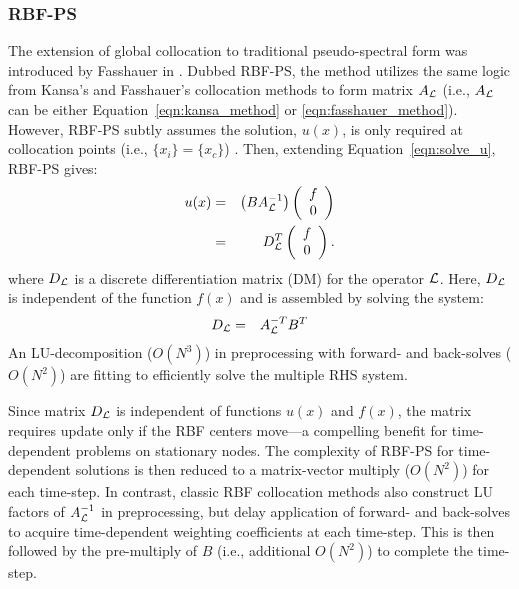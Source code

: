 \documentclass[11pt]{report}
\begin{document}
{%
\subsubsection{RBF-PS}

The extension of global collocation to traditional pseudo-spectral form was introduced by Fasshauer in \cite{Fasshauer2006}. Dubbed RBF-PS, the method utilizes the same logic from Kansa's and Fasshauer's collocation methods to form matrix $A_{\mathcal{L}}$ (i.e., $A_{\mathcal{L}}$ can be either Equation~\ref{eqn:kansa_method} or \ref{eqn:fasshauer_method}). However, RBF-PS subtly assumes the solution, $u(x)$, is only required at collocation points (i.e., $\{x_i\} = \{x_c\}$) \cite{Fasshauer2006, Fasshauer2007}. Then, extending Equation~\ref{eqn:solve_u}, RBF-PS gives:
\begin{eqnarray}
u(x) & = & \left( B A^{-1}_{\mathcal{L}} \right) \left( \begin{array}{cc}  f \\ 0  \end{array} \right) \nonumber \\
& = & D^T_{\mathcal{L}} \left( \begin{array}{cc}  f \\ 0  \end{array} \right) \label{eq:rbf-ps}.
\end{eqnarray}
where $D_{\mathcal{L}}$ is a discrete differentiation matrix (DM) for the operator $\mathcal{L}$.
Here, $D_{\mathcal{L}}$ is independent of the function $f(x)$ and is assembled by solving the system: 
\begin{eqnarray}
D_{\mathcal{L}} & = & A^{-T}_{\mathcal{L}} B^T
\end{eqnarray}
An LU-decomposition ($O(N^3)$) in preprocessing with forward- and back-solves ($O(N^2)$) are fitting to efficiently solve the multiple RHS system\cite{WrightFlyerYuen10,Fasshauer2007}. 

Since matrix $D_{\mathcal{L}}$ is independent of functions $u(x)$ and $f(x)$, the matrix requires update only if the RBF centers move---a compelling benefit for time-dependent problems on stationary nodes. The complexity of RBF-PS for time-dependent solutions is then reduced to a matrix-vector multiply ($O(N^2)$) for each time-step. In contrast, classic RBF collocation methods also construct LU factors of $A_{\mathcal{L}}^{-1}$ in preprocessing, but delay application of forward- and back-solves to acquire time-dependent weighting coefficients at each time-step. This is then followed by the pre-multiply of $B$ (i.e., additional $O(N^2)$) to complete the time-step.
 

}
\end{document}
